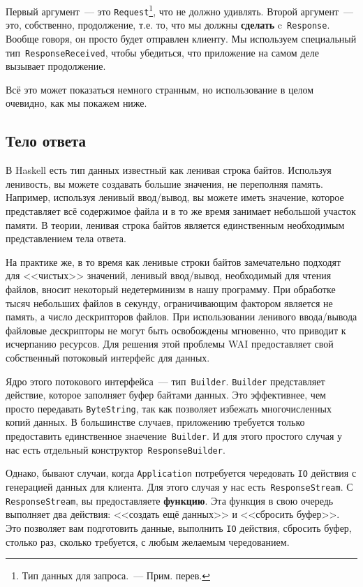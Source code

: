Первый аргумент~--- это \lstinline'Request'\footnote{Тип данных для
    запроса.~--- Прим. перев.}, что не должно удивлять. Второй аргумент~---
это, собственно, продолжение, т.е. то, что мы должны \textbf{сделать}
c~\lstinline'Response'. Вообще говоря, он просто будет отправлен клиенту. Мы
используем специальный тип~\lstinline'ResponseReceived', чтобы убедиться, что
приложение на самом деле вызывает продолжение.

Всё это может показаться немного странным, но использование в целом очевидно,
как мы покажем ниже.

\subsection {Тело ответа}
В Haskell есть тип данных известный как ленивая строка байтов. Используя
ленивость, вы можете создавать большие значения, не переполняя память.
Например, используя ленивый ввод/вывод, вы можете иметь значение, которое
представляет всё содержимое файла и в то же время занимает небольшой участок
памяти. В теории, ленивая строка байтов является единственным необходимым
представлением тела ответа.

На практике же, в то время как ленивые строки байтов замечательно подходят для
<<чистых>> значений, ленивый ввод/вывод, необходимый для чтения файлов, вносит
некоторый недетерминизм в нашу программу. При обработке тысяч небольших файлов
в секунду, ограничивающим фактором является не память, а число дескрипторов
файлов. При использовании ленивого ввода/вывода файловые дескрипторы не могут
быть освобождены мгновенно, что приводит к исчерпанию ресурсов. Для решения
этой проблемы WAI предоставляет свой собственный потоковый интерфейс для данных.

Ядро этого потокового интерфейса~--- тип~\lstinline'Builder'.
\lstinline'Builder' представляет действие, которое заполняет буфер байтами
данных. Это эффективнее, чем просто передавать \lstinline'ByteString', так как
позволяет избежать многочисленных копий данных. В большинстве случаев,
приложению требуется только предоставить единственное
знаечение~\lstinline'Builder'. И для этого простого случая у нас есть отдельный
конструктор~\lstinline'ResponseBuilder'.

Однако, бывают случаи, когда \lstinline'Application' потребуется чередовать
\lstinline'IO' действия с генерацией данных для клиента. Для этого случая у нас
есть~\lstinline'ResponseStream'. С \lstinline'ResponseStream', вы
предоставляете \textbf{функцию}. Эта функция в свою очередь выполняет два
действия: <<создать ещё данных>> и <<сбросить буфер>>. Это позволяет вам
подготовить данные, выполнить \lstinline'IO' действия, сбросить буфер, столько
раз, сколько требуется, с любым желаемым чередованием.

